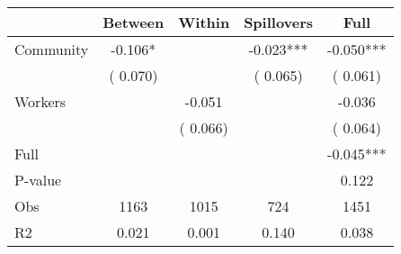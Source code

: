 
\begin{tabular}{l*{4}{c}}\hline&\multicolumn{1}{c}{Between}&\multicolumn{1}{c}{Within}&\multicolumn{1}{c}{Spillovers}&\multicolumn{1}{c}{Full}\\ \hline
 Community             &             -0.106*      &                                               &       -0.023*** &        -0.050***                            \\ 
                               &        (       0.070)           &                                       &       (       0.065)     &      (       0.061)                                           \\ 
 Workers       &                                               &       -0.051    &                                &            -0.036                            \\ 
                               &                                               & (       0.066)                  &                                        &      (       0.064)                                           \\ 
\hline                                                                                                                                                                                                                                            
 Full                  &                                               &                                               &                                        &            -0.045***                                     \\ 
 P-value               &                                               &                                               &                                        &             0.122                                           \\ 
 Obs                   &               1163               &       1015                       &       724                &              1451                                               \\ 
 R2                    &                      0.021              &              0.001                      &              0.140               &                     0.038                                              \\ 
\hline \end{tabular}                                                                                                                                                                                                              